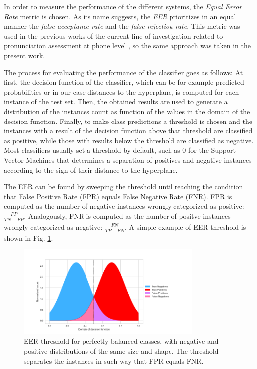 In order to measure the performance of the different systems, the \textit{Equal Error Rate} metric
is chosen. As its name suggests, the \textit{EER} prioritizes in an equal manner the
\textit{false acceptance rate} and the \textit{false rejection rate}. This metric was used
in the previous works of the current line of investigation related to pronunciation assessment
at phone level \cite{detection_phone_level_mispronunciation_learning, main}, so the same approach
was taken in the present work.

The process for evaluating the performance of the classifier goes as follows:
At first, the decision function of the classifier, which can be for example predicted probabilities
or in our case distances to the hyperplane, is computed for each instance of the test set.
Then, the obtained results are used to generate
a distribution of the instances count as function of the values
in the domain of the decision function. Finally,
to make class predictions a threshold is chosen and the instances with a result of the
decision function above that threshold are classified as positive, while
those with results below the threshold are classified as negative. Most classifiers
usually set a threshold by default, such as 0 for the Support Vector Machines that
determines a separation of
positives and negative instances according to the sign of their distance to the hyperplane.

The EER can be found by sweeping the threshold until reaching the condition that
False Positive Rate (FPR) equals False Negative Rate (FNR). FPR is computed as
the number of negative instances wrongly categorized as positive: $\frac{FP}{TN+FP}$.
Analogously, FNR is computed as the number of positve instances wrongly categorized as negative:
$\frac{FN}{TP+FN}$. A simple example of EER threshold is
shown in Fig. \ref{fig:eer}.

\begin{figure}[H]
  \centering
  \includegraphics[width=0.8\textwidth]{files/figures/method/eer}
  \caption{EER threshold for perfectly balanced classes, with negative and positive distributions
  of the same size and shape.
  The threshold separates the instances in such way that FPR equals FNR.}
  \label{fig:eer}
\end{figure}

